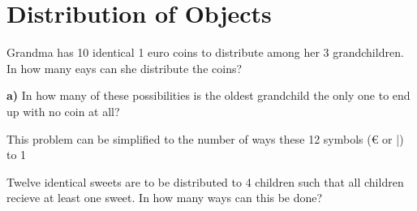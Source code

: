 \section{Distribution of Objects}

\begin{example}
		Grandma has 10 identical 1 euro coins to distribute among her 3 grandchildren. In how many eays can she distribute the coins?
		
		\quad \textbf{a)} In how many of these possibilities is the oldest grandchild the only one to end up with no coin at all?
\end{example}

This problem can be simplified to the number of ways these 12 symbols (€ or |) to 1

\begin{example}
Twelve identical sweets are to be distributed to 4 children such that all children recieve at least one sweet. In how many ways can this be done? 	
\end{example}
